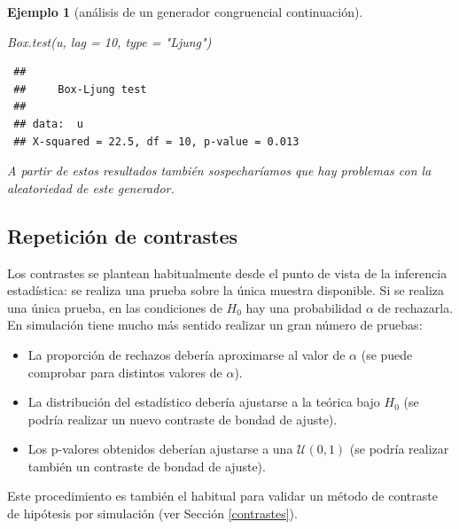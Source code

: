 \documentclass[
  10pt,
]{book}
\newenvironment{Shaded}{\begin{snugshade}}{\end{snugshade}}
\newcommand{\AttributeTok}[1]{\textcolor[rgb]{0.77,0.63,0.00}{#1}}
\newcommand{\DecValTok}[1]{\textcolor[rgb]{0.00,0.00,0.81}{#1}}
\newcommand{\FunctionTok}[1]{\textcolor[rgb]{0.00,0.00,0.00}{#1}}
\newcommand{\NormalTok}[1]{#1}
\newcommand{\StringTok}[1]{\textcolor[rgb]{0.31,0.60,0.02}{#1}}
\theoremstyle{break}
\newtheorem{example}{Ejemplo}[chapter]
\theoremstyle{nonumberplain}
\begin{document}
\begin{example}[análisis de un generador congruencial continuación]
\begin{Shaded}
\begin{Highlighting}[]
\FunctionTok{Box.test}\NormalTok{(u, }\AttributeTok{lag =} \DecValTok{10}\NormalTok{, }\AttributeTok{type =} \StringTok{"Ljung"}\NormalTok{)}
\end{Highlighting}
\end{Shaded}

\begin{verbatim}
 ## 
 ##     Box-Ljung test
 ## 
 ## data:  u
 ## X-squared = 22.5, df = 10, p-value = 0.013
\end{verbatim}

A partir de estos resultados también sospecharíamos que hay problemas con la aleatoriedad de este generador.
\end{example}

\hypertarget{repeticiuxf3n-de-contrastes}{%
\subsection{Repetición de contrastes}\label{repeticiuxf3n-de-contrastes}}

Los contrastes se plantean habitualmente desde el punto de vista de la inferencia estadística: se realiza una prueba sobre la única muestra disponible.
Si se realiza una única prueba, en las condiciones de \(H_0\) hay una probabilidad \(\alpha\) de rechazarla.
En simulación tiene mucho más sentido realizar un gran número de pruebas:

\begin{itemize}
\item
  La proporción de rechazos debería aproximarse al valor de
  \(\alpha\) (se puede comprobar para distintos valores de \(\alpha\)).
\item
  La distribución del estadístico debería ajustarse a la teórica
  bajo \(H_0\) (se podría realizar un nuevo contraste de bondad
  de ajuste).
\item
  Los p-valores obtenidos deberían ajustarse a una
  \(\mathcal{U}\left(0,1\right)\) (se podría realizar también un
  contraste de bondad de ajuste).
\end{itemize}

Este procedimiento es también el habitual para validar un método de
contraste de hipótesis por simulación (ver Sección \ref{contrastes}).
\end{document}
